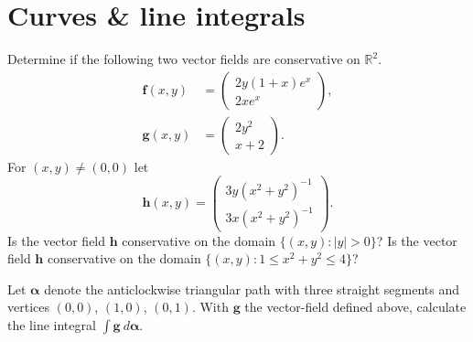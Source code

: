 \section{Curves \& line integrals}

\begin{task}
    Determine if the following two vector fields are conservative on \(\mathbb{R}^2\).
    \[
        \begin{aligned}
            \mathbf{f}(x,y)
             & =
            \begin{pmatrix}
                2y(1 + x )e^x \\ 2x e^x
            \end{pmatrix}, \\
            \mathbf{g}(x,y)
             & =
            \begin{pmatrix}
                2y^2 \\
                x+2
            \end{pmatrix}.
        \end{aligned}
    \]
    For \((x,y) \neq (0,0)\) let
    \[
        \mathbf{h}(x,y) =
        \begin{pmatrix}
            3 y {(x^2+y^2)}^{-1} \\
            3 x {(x^2+y^2)}^{-1}
        \end{pmatrix}.
    \]
    Is the vector field \(\mathbf{h}\) conservative on the domain \(\{(x,y): |y| > 0 \}\)?
    Is the vector field \(\mathbf{h}\) conservative on the domain \(\{(x,y): 1 \leq x^2+y^2 \leq 4 \}\)?

    Let \(\boldsymbol\alpha\) denote the anticlockwise triangular path with three straight segments and vertices \((0,0)\), \((1,0)\), \((0,1)\).
    With \(\mathbf{g}\) the vector-field defined above, calculate the line integral
    \(\int \mathbf{g} \ d\boldsymbol\alpha\).
\end{task}

